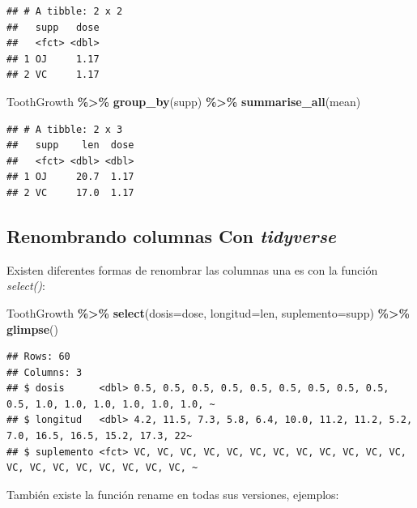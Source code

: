 \documentclass[
]{book}
\newenvironment{Shaded}{\begin{snugshade}}{\end{snugshade}}
\newcommand{\AttributeTok}[1]{\textcolor[rgb]{0.13,0.29,0.53}{#1}}
\newcommand{\FunctionTok}[1]{\textcolor[rgb]{0.13,0.29,0.53}{\textbf{#1}}}
\newcommand{\NormalTok}[1]{#1}
\newcommand{\SpecialCharTok}[1]{\textcolor[rgb]{0.81,0.36,0.00}{\textbf{#1}}}
\begin{document}
\begin{verbatim}
## # A tibble: 2 x 2
##   supp   dose
##   <fct> <dbl>
## 1 OJ     1.17
## 2 VC     1.17
\end{verbatim}

\begin{Shaded}
\begin{Highlighting}[]
\NormalTok{ToothGrowth }\SpecialCharTok{\%\textgreater{}\%}  \FunctionTok{group\_by}\NormalTok{(supp) }\SpecialCharTok{\%\textgreater{}\%}  \FunctionTok{summarise\_all}\NormalTok{(mean)}
\end{Highlighting}
\end{Shaded}

\begin{verbatim}
## # A tibble: 2 x 3
##   supp    len  dose
##   <fct> <dbl> <dbl>
## 1 OJ     20.7  1.17
## 2 VC     17.0  1.17
\end{verbatim}

\hfill\break

\subsection{\texorpdfstring{Renombrando columnas Con \emph{tidyverse}}{Renombrando columnas Con tidyverse}}\label{renombrando-columnas-con-tidyverse}

Existen diferentes formas de renombrar las columnas una es con la función \emph{select()}:

\begin{Shaded}
\begin{Highlighting}[]
\NormalTok{ToothGrowth }\SpecialCharTok{\%\textgreater{}\%} \FunctionTok{select}\NormalTok{(}\AttributeTok{dosis=}\NormalTok{dose, }\AttributeTok{longitud=}\NormalTok{len, }\AttributeTok{suplemento=}\NormalTok{supp) }\SpecialCharTok{\%\textgreater{}\%} \FunctionTok{glimpse}\NormalTok{()}
\end{Highlighting}
\end{Shaded}

\begin{verbatim}
## Rows: 60
## Columns: 3
## $ dosis      <dbl> 0.5, 0.5, 0.5, 0.5, 0.5, 0.5, 0.5, 0.5, 0.5, 0.5, 1.0, 1.0, 1.0, 1.0, 1.0, 1.0, ~
## $ longitud   <dbl> 4.2, 11.5, 7.3, 5.8, 6.4, 10.0, 11.2, 11.2, 5.2, 7.0, 16.5, 16.5, 15.2, 17.3, 22~
## $ suplemento <fct> VC, VC, VC, VC, VC, VC, VC, VC, VC, VC, VC, VC, VC, VC, VC, VC, VC, VC, VC, VC, ~
\end{verbatim}

\hfill\break
También existe la función rename en todas sus versiones, ejemplos:
\end{document}
